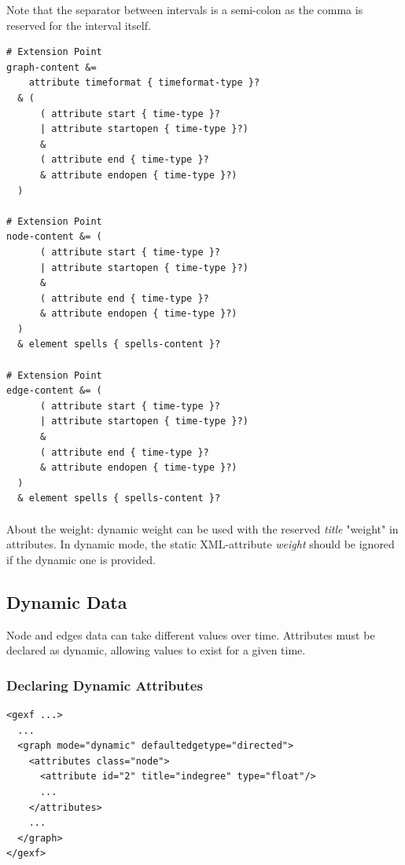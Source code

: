 \documentclass[a4paper,10pt]{article}
\begin{document}
Note that the separator between intervals is a semi-colon as the comma is reserved for the interval itself.

\lstset{ style=rnc }
\begin{lstlisting}[caption={Dynamic Topology Specification},label=dyntopoRNC]
# Extension Point
graph-content &=
    attribute timeformat { timeformat-type }?
  & (
      ( attribute start { time-type }?
      | attribute startopen { time-type }?)
      &
      ( attribute end { time-type }?
      & attribute endopen { time-type }?)
  )

# Extension Point
node-content &= (
      ( attribute start { time-type }?
      | attribute startopen { time-type }?)
      &
      ( attribute end { time-type }?
      & attribute endopen { time-type }?)
  )
  & element spells { spells-content }?

# Extension Point
edge-content &= (
      ( attribute start { time-type }?
      | attribute startopen { time-type }?)
      &
      ( attribute end { time-type }?
      & attribute endopen { time-type }?)
  )
  & element spells { spells-content }?
\end{lstlisting}

\paragraph{}
About the weight: dynamic weight can be used with the reserved \textit{title} "weight" in attributes. In dynamic mode, the static XML-attribute \textit{weight} should be ignored if the dynamic one is provided.

\subsection{Dynamic Data}

Node and edges data can take different values over time. Attributes must be declared as dynamic, allowing values to exist for a given time.

\subsubsection{Declaring Dynamic Attributes}

\lstset{ style=gexf }
\begin{lstlisting}[caption={Indegree may change over time}]
<gexf ...>
  ...
  <graph mode="dynamic" defaultedgetype="directed">
    <attributes class="node">
      <attribute id="2" title="indegree" type="float"/>
      ...
    </attributes>
    ...
  </graph>
</gexf>
\end{lstlisting}
\end{document}
